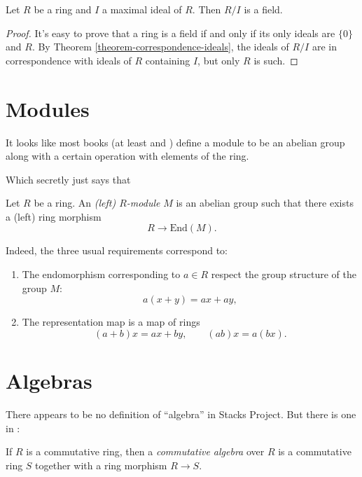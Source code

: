 \begin{lemma}
\label{lemma-quotient-ring-maximal-ideal-is-field}
Let $R$ be a ring and $I$ a maximal ideal of $R$.
Then $R/I$ is a field.
\end{lemma}

\begin{proof}
It's easy to prove that a ring is a field if and only if its
only ideals are $\{0\}$ and $R$. By Theorem \ref{theorem-correspondence-ideals},
the ideals of $R/I$ are in correspondence with ideals of $R$ containing $I$,
but only $R$ is such.
\end{proof}

\section{Modules}
\label{section-modules}

It looks like most books (at least
\cite{eis} and \cite{Samuel-Zariski-Vol1})
define a module to be an abelian group
along with a certain operation with
elements of the ring.

Which secretly just says that

\begin{definition}
\label{definition-module}
Let $R$ be a ring.
An {\it (left) $R$-module} $M$ is an abelian group
such that there exists a (left) ring morphism
$$
R \to \text{End}(M).
$$
\end{definition}

\noindent
Indeed, the three usual requirements
correspond to:

\begin{enumerate}
\item The endomorphism corresponding to $a \in R$ 
respect the group structure of the group $M$:
$$
a(x+y)=ax+ay,
$$

\item The representation map is a map of rings
$$
(a+b)x=ax+by,\qquad (ab)x=a(bx).
$$
\end{enumerate}

\noindent


\section{Algebras}
\label{section-algebras}

\noindent
There appears to be no definition of ``algebra''
in Stacks Project.
But there is one in \cite{Eisenbud}:

\begin{definition}
\label{definition-algebra}
If $R$ is a commutative ring,
then a {\it commutative algebra} over $R$ 
is a commutative ring $S$ together
with a ring morphism $R \to S$.
\end{definition}

